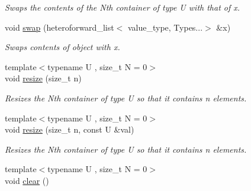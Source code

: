 \begin{DoxyCompactItemize}
\begin{DoxyCompactList}\small\item\em Swaps the contents of the Nth container of type U with that of x. \end{DoxyCompactList}\item 
\hypertarget{classheterogeneous_1_1heteroforward__list_3_01_t_00_01_types_8_8_8_4_a71f419d7170e09d09388767dae134bd7}{}void \hyperlink{classheterogeneous_1_1heteroforward__list_3_01_t_00_01_types_8_8_8_4_a71f419d7170e09d09388767dae134bd7}{swap} (heteroforward\+\_\+list$<$ value\+\_\+type, Types...$>$ \&x)\label{classheterogeneous_1_1heteroforward__list_3_01_t_00_01_types_8_8_8_4_a71f419d7170e09d09388767dae134bd7}

\begin{DoxyCompactList}\small\item\em Swaps contents of object with x. \end{DoxyCompactList}\item 
\hypertarget{classheterogeneous_1_1heteroforward__list_3_01_t_00_01_types_8_8_8_4_a33aa7a1cdd33ec3f15869a5155ee5974}{}{\footnotesize template$<$typename U , size\+\_\+t N = 0$>$ }\\void \hyperlink{classheterogeneous_1_1heteroforward__list_3_01_t_00_01_types_8_8_8_4_a33aa7a1cdd33ec3f15869a5155ee5974}{resize} (size\+\_\+t n)\label{classheterogeneous_1_1heteroforward__list_3_01_t_00_01_types_8_8_8_4_a33aa7a1cdd33ec3f15869a5155ee5974}

\begin{DoxyCompactList}\small\item\em Resizes the Nth container of type U so that it contains n elements. \end{DoxyCompactList}\item 
\hypertarget{classheterogeneous_1_1heteroforward__list_3_01_t_00_01_types_8_8_8_4_a95c8cfac0496722185fb1ec5c696e466}{}{\footnotesize template$<$typename U , size\+\_\+t N = 0$>$ }\\void \hyperlink{classheterogeneous_1_1heteroforward__list_3_01_t_00_01_types_8_8_8_4_a95c8cfac0496722185fb1ec5c696e466}{resize} (size\+\_\+t n, const U \&val)\label{classheterogeneous_1_1heteroforward__list_3_01_t_00_01_types_8_8_8_4_a95c8cfac0496722185fb1ec5c696e466}

\begin{DoxyCompactList}\small\item\em Resizes the Nth container of type U so that it contains n elements. \end{DoxyCompactList}\item 
\hypertarget{classheterogeneous_1_1heteroforward__list_3_01_t_00_01_types_8_8_8_4_a631ccd087f57ea6e2dfd5019b37f1849}{}{\footnotesize template$<$typename U , size\+\_\+t N = 0$>$ }\\void \hyperlink{classheterogeneous_1_1heteroforward__list_3_01_t_00_01_types_8_8_8_4_a631ccd087f57ea6e2dfd5019b37f1849}{clear} ()\label{classheterogeneous_1_1heteroforward__list_3_01_t_00_01_types_8_8_8_4_a631ccd087f57ea6e2dfd5019b37f1849}


\end{DoxyCompactItemize}
